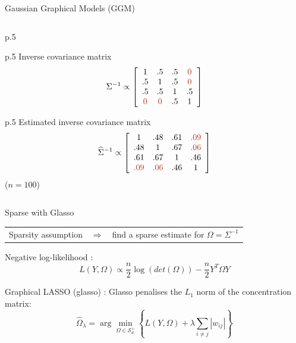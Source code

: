 \documentclass{beamer}
\newcommand{\emphase}[1]{\textcolor{Complement}{#1}}
\begin{document}
\begin{frame}{Gaussian Graphical Models (GGM)}
\begin{columns}
\begin{column}{12cm}
\begin{overprint}
\begin{tabular}{p{.5\textwidth}}
$$	 $$
    \end{tabular} 
    \begin{tabular}{p{.5\textwidth}}
	 Inverse covariance matrix
	 $$
	 \Sigma^{-1} \propto \left[ \begin{array}{cccc}
	   1 & .5 & .5 & \emphase{0} \\
	   .5 & 1 & .5 & \emphase{0} \\
	   .5 & .5 & 1 & .5 \\
	   \emphase{0} & \emphase{0} & .5 & 1
	   \end{array} \right] 
	 $$
    \end{tabular} 
    \begin{tabular}{p{.5\textwidth}}
	 Estimated inverse covariance matrix
	 $$
	 \widehat{\Sigma}^{-1} \propto \left[ \begin{array}{cccc}
	   1 & .48 & .61 & \emphase{.09} \\
	   .48 & 1 & .67 & \emphase{.06} \\
	   .61 & .67 & 1 & .46 \\
	   \emphase{.09} & \emphase{.06} & .46 & 1
	   \end{array} \right] 
	 $$
	 ($n = 100$)
    \end{tabular} 
    \end{overprint}
  \end{column}
  \end{columns}



\end{frame}
\begin{frame}{Sparse with Glasso}
\begin{tabularx}{\linewidth}{ccc}
Sparsity assumption &  
$\Rightarrow$ & find a {\color{Nicered} sparse estimate }for $\Omega=\Sigma^{-1}$\\
\end{tabularx}
\vspace{0.5cm}

\emphase{Negative log-likelihood :}
 \[L(Y,\Omega) \propto \frac{n}{2}\log(det(\Omega))-\frac{n}{2} Y^T\Omega Y\]


 \begin{block}{ Graphical LASSO (glasso) :}
  Glasso penalises the $L_1$ norm of the concentration matrix:
  \[\widehat{\Omega}_\lambda = \arg\min_{\Omega \in \mathcal{S}_d^+}\left\{ L(Y,\Omega)+\lambda \sum_{i\neq j} |w_{ij}| \right\}\]
 \end{block}
 
\end{frame}
\end{document}
